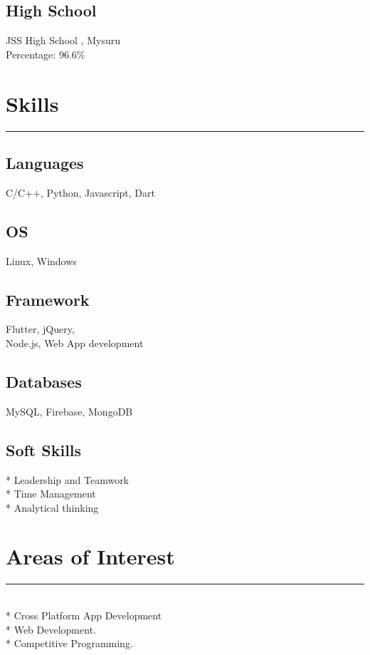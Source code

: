 \documentclass[]{rahulworld-resume}
\begin{document}
\begin{minipage}[t]{0.33\textwidth}
\subsection{High School}
JSS High School , Mysuru\\
Percentage: 96.6\%
\sectionsep



\section{Skills}
\noindent\rule{5cm}{0.4pt}
\vspace{6pt}
\subsection{Languages}
C/C++, Python, Javascript, Dart
\vspace{6pt}
\subsection{OS}
Linux, Windows
\vspace{6pt}
\subsection{Framework}
Flutter, jQuery, \\ Node.js,
Web App development
\vspace{6pt}
\subsection{Databases}
MySQL, Firebase, MongoDB
\vspace{6pt}
\subsection{Soft Skills}
* Leadership and Teamwork
\\
* Time Management\\
* Analytical thinking

\sectionsep



\section{Areas of Interest}
\noindent\rule{5cm}{0.4pt}
\vspace{6pt}\\
* Cross Platform App Development\\
* Web Development.\\
* Competitive Programming.


\sectionsep

%
%

\end{minipage} 
\end{document}

